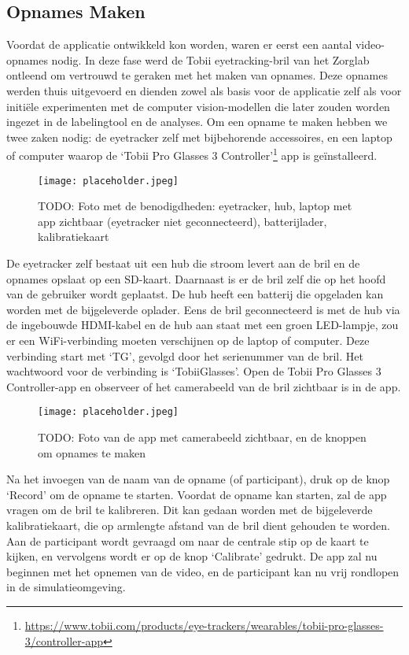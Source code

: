 \subsection{Opnames Maken}

Voordat de applicatie ontwikkeld kon worden, waren er eerst een aantal video-opnames nodig. 
In deze fase werd de Tobii eyetracking-bril van het Zorglab ontleend om vertrouwd te geraken met het maken van opnames. 
Deze opnames werden thuis uitgevoerd en dienden zowel als basis voor de applicatie zelf als voor initiële experimenten met de computer vision-modellen die later zouden worden ingezet in de labelingtool en de analyses.
Om een opname te maken hebben we twee zaken nodig: de eyetracker zelf met bijbehorende accessoires, en een laptop of computer waarop de `Tobii Pro Glasses 3 Controller'\footnote{\url{https://www.tobii.com/products/eye-trackers/wearables/tobii-pro-glasses-3/controller-app}} app is geïnstalleerd.

\begin{figure}[H]
  \centering
  \texttt{[image: placeholder.jpeg]}
  \caption[]{\label{fig:todo} TODO: Foto met de benodigdheden: eyetracker, hub, laptop met app zichtbaar (eyetracker niet geconnecteerd), batterijlader, kalibratiekaart
 }
\end{figure}

De eyetracker zelf bestaat uit een hub die stroom levert aan de bril en de opnames opslaat op een SD-kaart. Daarnaast is er de bril zelf die op het hoofd van de gebruiker wordt geplaatst.
De hub heeft een batterij die opgeladen kan worden met de bijgeleverde oplader. 
Eens de bril geconnecteerd is met de hub via de ingebouwde HDMI-kabel en de hub aan staat met een groen LED-lampje, zou er een WiFi-verbinding moeten verschijnen op de laptop of computer.
Deze verbinding start met `TG', gevolgd door het serienummer van de bril. Het wachtwoord voor de verbinding is `TobiiGlasses'. 
Open de Tobii Pro Glasses 3 Controller-app en observeer of het camerabeeld van de bril zichtbaar is in de app.

\begin{figure}[H]
  \centering
  \texttt{[image: placeholder.jpeg]}
  \caption[]{\label{fig:todo} TODO: Foto van de app met camerabeeld zichtbaar, en de knoppen om opnames te maken
 }
\end{figure}

Na het invoegen van de naam van de opname (of participant), druk op de knop `Record' om de opname te starten.
Voordat de opname kan starten, zal de app vragen om de bril te kalibreren. 
Dit kan gedaan worden met de bijgeleverde kalibratiekaart, die op armlengte afstand van de bril dient gehouden te worden.
Aan de participant wordt gevraagd om naar de centrale stip op de kaart te kijken, en vervolgens wordt er op de knop `Calibrate' gedrukt.
De app zal nu beginnen met het opnemen van de video, en de participant kan nu vrij rondlopen in de simulatieomgeving.

